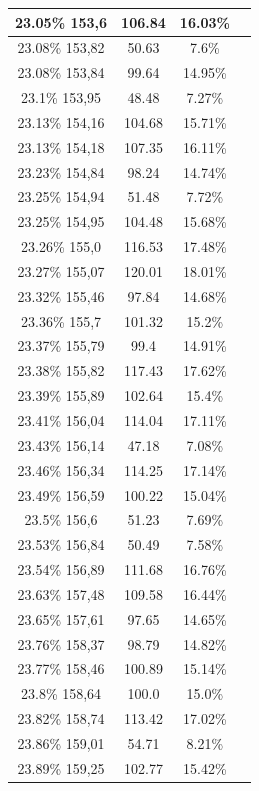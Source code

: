 \begin{center}
\begin{longtable}{|c|c|c|c|}
23.05\% 153,6 & 106.84 & 16.03\%  \\ \hline
23.08\% 153,82 & 50.63 & 7.6\%  \\ \hline
23.08\% 153,84 & 99.64 & 14.95\%  \\ \hline
23.1\% 153,95 & 48.48 & 7.27\%  \\ \hline
23.13\% 154,16 & 104.68 & 15.71\%  \\ \hline
23.13\% 154,18 & 107.35 & 16.11\%  \\ \hline
23.23\% 154,84 & 98.24 & 14.74\%  \\ \hline
23.25\% 154,94 & 51.48 & 7.72\%  \\ \hline
23.25\% 154,95 & 104.48 & 15.68\%  \\ \hline
23.26\% 155,0 & 116.53 & 17.48\%  \\ \hline
23.27\% 155,07 & 120.01 & 18.01\%  \\ \hline
23.32\% 155,46 & 97.84 & 14.68\%  \\ \hline
23.36\% 155,7 & 101.32 & 15.2\%  \\ \hline
23.37\% 155,79 & 99.4 & 14.91\%  \\ \hline
23.38\% 155,82 & 117.43 & 17.62\%  \\ \hline
23.39\% 155,89 & 102.64 & 15.4\%  \\ \hline
23.41\% 156,04 & 114.04 & 17.11\%  \\ \hline
23.43\% 156,14 & 47.18 & 7.08\%  \\ \hline
23.46\% 156,34 & 114.25 & 17.14\%  \\ \hline
23.49\% 156,59 & 100.22 & 15.04\%  \\ \hline
23.5\% 156,6 & 51.23 & 7.69\%  \\ \hline
23.53\% 156,84 & 50.49 & 7.58\%  \\ \hline
23.54\% 156,89 & 111.68 & 16.76\%  \\ \hline
23.63\% 157,48 & 109.58 & 16.44\%  \\ \hline
23.65\% 157,61 & 97.65 & 14.65\%  \\ \hline
23.76\% 158,37 & 98.79 & 14.82\%  \\ \hline
23.77\% 158,46 & 100.89 & 15.14\%  \\ \hline
23.8\% 158,64 & 100.0 & 15.0\%  \\ \hline
23.82\% 158,74 & 113.42 & 17.02\%  \\ \hline
23.86\% 159,01 & 54.71 & 8.21\%  \\ \hline
23.89\% 159,25 & 102.77 & 15.42\%  \\ \hline

\end{longtable}
\end{center}
